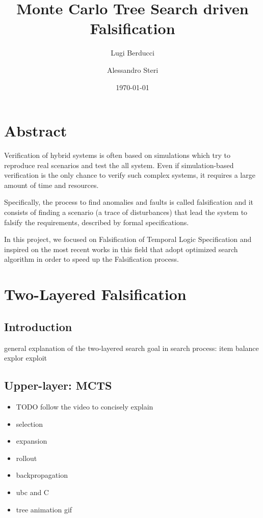 \documentclass[11pt]{article}
\title{Monte Carlo Tree Search driven Falsification}
\author{Lugi Berducci \and Alessandro Steri}
\date{\today}
\begin{document}
\maketitle	
\pagebreak

\tableofcontents
\pagebreak


\section{Abstract}
Verification of hybrid systems is often based on simulations which try to reproduce real scenarios and test the all system. Even if simulation-based verification is the only chance to verify such complex systems, it requires a large amount of time and resources.

Specifically, the process to find anomalies and faults is called falsification and it consists of finding a scenario (a trace of disturbances) that lead the system to falsify the requirements, described by formal specifications.

In this project, we focused on Falsification of Temporal Logic Specification and inspired on the most recent works in this field that adopt optimized search algorithm in order to speed up the Falsification process.

\pagebreak

\section{Two-Layered Falsification}
\subsection{Introduction}
general explanation of the two-layered search
goal in search process: item balance explor exploit

\subsection{Upper-layer: MCTS}
\begin{itemize}
    \item TODO follow the video to concisely explain
    \item selection
    \item expansion
    \item rollout
    \item backpropagation
    \item ubc and C
    \item tree animation gif
\end{itemize}
\end{document}
